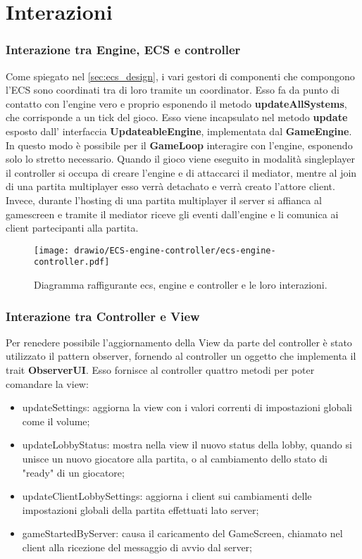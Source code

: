 \section{Interazioni}
\label{sec:interactions_design}

\subsubsection{Interazione tra Engine, ECS e controller}
Come spiegato nel \ref{sec:ecs_design}, i vari gestori di componenti che compongono l'ECS sono coordinati tra di loro tramite un coordinator. Esso fa da punto di contatto con l'engine vero e proprio esponendo il metodo \textbf{updateAllSystems}, che corrisponde a un tick del gioco. Esso viene incapsulato nel metodo \textbf{update} esposto dall' interfaccia \textbf{UpdateableEngine}, implementata dal \textbf{GameEngine}. In questo modo è possibile per il \textbf{GameLoop} interagire con l'engine, esponendo solo lo stretto necessario.
Quando il gioco viene eseguito in modalità singleplayer il controller si occupa di creare l'engine e di attaccarci il mediator, mentre al join di una partita multiplayer esso verrà detachato e verrà creato l'attore client. Invece, durante l'hosting di una partita multiplayer il server si affianca al gamescreen e tramite il mediator riceve gli eventi dall'engine e li comunica ai client partecipanti alla partita.
\begin{figure}[H]
	\centering
	\texttt{[image: drawio/ECS-engine-controller/ecs-engine-controller.pdf]}
	\caption{Diagramma raffigurante ecs, engine e controller e le loro interazioni.}
	\label{fig:ecs-engine-controller}
\end{figure}



\subsubsection{Interazione tra Controller e View}
Per renedere possibile l'aggiornamento della View da parte del controller è stato utilizzato il pattern observer, fornendo al controller un oggetto che implementa il trait \textbf{ObserverUI}. Esso fornisce al controller quattro metodi per poter comandare la view: 
\begin{itemize}
    \item updateSettings: aggiorna la view con i valori correnti di impostazioni globali come il volume;
    \item updateLobbyStatus: mostra nella view il nuovo status della lobby, quando si unisce un nuovo giocatore alla partita, o al cambiamento dello stato di "ready" di un giocatore;
    \item updateClientLobbySettings: aggiorna i client sui cambiamenti delle impostazioni globali della partita effettuati lato server; 
    \item gameStartedByServer: causa il caricamento del GameScreen, chiamato nel client alla ricezione del messaggio di avvio dal server;
\end{itemize}



